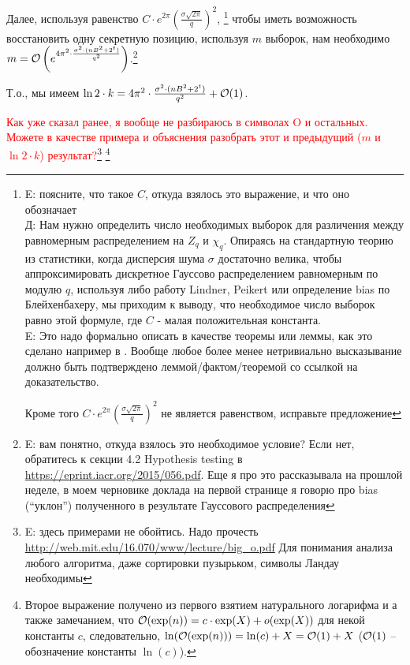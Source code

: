 \documentclass[a4paper,11pt]{article}
\begin{document}
Далее, используя равенство $C \cdot e^{2\pi}(\frac{\sigma \sqrt{2\pi}}{q})^2$, \footnote{E: поясните, что такое $C$, откуда взялось это выражение, и что оно обозначает \\ Д: Нам нужно определить число необходимых выборок для различения между равномерным распределением на $Z_q$ и $\chi_q$. Опираясь на стандартную теорию из статистики, когда дисперсия шума $\sigma$ достаточно велика, чтобы аппроксимировать дискретное Гауссово распределением равномерным по модулю $q$, используя либо работу Lindner, Peikert или определение bias по Блейхенбахеру, мы приходим к выводу, что необходимое число выборок равно этой формуле, где $C$ - малая положительная константа. \\
	E: Это надо формально описать в качестве теоремы или леммы, как это сделано например в \cite{KF15}.
		Вообще любое более менее нетривиально высказывание должно быть подтверждено леммой/фактом/теоремой со ссылкой на доказательство.
	
	Кроме того $C \cdot e^{2\pi}(\frac{\sigma \sqrt{2\pi}}{q})^2$ не является равенством, исправьте предложение
	


} чтобы иметь возможность восстановить одну секретную позицию, используя $m$ выборок, нам необходимо $m=\mathcal{O}\left(e^{4\pi^2 \cdot \frac{\sigma^2 \cdot (nB^2+2^t)}{q^2}}\right)$.\footnote{E: вам понятно, откуда взялось это необходимое условие? Если нет, обратитесь к секции 4.2 Hypothesis testing в \url{https://eprint.iacr.org/2015/056.pdf}. Еще я про это рассказывала на прошлой неделе, в моем черновике доклада на первой странице я говорю про bias (``уклон'') полученного в результате Гауссового распределения }

Т.о., мы имеем $\ln{2} \cdot k = 4\pi^2 \cdot \frac{\sigma^2 \cdot (nB^2+2^t)}{q^2} + \mathcal{O}(1)$.

\textcolor{red}{Как уже сказал ранее, я вообще не разбираюсь в символах O и остальных. Можете в качестве примера и объяснения разобрать этот и предыдущий ($m$ и $\ln{2} \cdot k$) результат?}\footnote{E: здесь примерами не обойтись. Надо прочесть \url{http://web.mit.edu/16.070/www/lecture/big_o.pdf}
Для понимания анализа любого алгоритма, даже сортировки пузырьком, символы Ландау необходимы
}
\footnote{Второе выражение получено из первого взятием натурального логарифма и а также замечанием, что $\mathcal{O}(\exp(n)) = c \cdot \exp(X) + o(\exp(X))$ для некой константы $c$, следовательно, $ \ln(\mathcal{O}(\exp(n)) ) = \ln(c) + X = \mathcal{O}(1) + X$ ($\mathcal{O}(1)$ -- обозначение константы $\ln(c)$).  }
\end{document}
